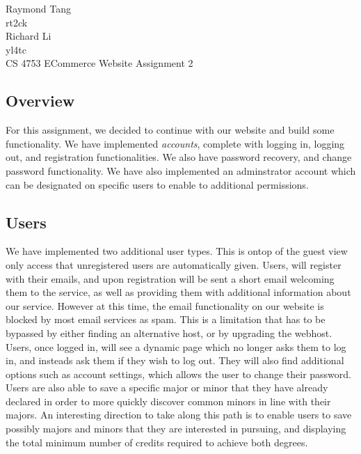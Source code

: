 \documentclass{article}
\begin{document}
\begin{singlespace}
\noindent Raymond Tang\\
rt2ck\\
Richard Li\\
yl4tc\\
CS 4753 ECommerce Website Assignment 2\\
\end{singlespace}

\begin{doublespace}
\subsection*{Overview}
\indent For this assignment, we decided to continue with our website and build some functionality. We have implemented \emph{accounts}, complete with logging in, logging out, and registration functionalities. We also have password recovery, and change password functionality. We have also implemented an adminstrator account which can be designated on specific users to enable to additional permissions.\\

\subsection*{Users}
\indent We have implemented two additional user types. This is ontop of the guest view only access that unregistered users are automatically given. Users, will register with their emails, and upon registration will be sent a short email welcoming them to the service, as well as providing them with additional information about our service. However at this time, the email functionality on our website is blocked by most email services as spam. This is a limitation that has to be bypassed by either finding an alternative host, or by upgrading the webhost.\\
\indent Users, once logged in, will see a dynamic page which no longer asks them to log in, and insteads ask them if they wish to log out. They will also find additional options such as account settings, which allows the user to change their password.\\
\indent Users are also able to save a specific major or minor that they have already declared in order to more quickly discover common minors in line with their majors. An interesting direction to take along this path is to enable users to save possibly majors and minors that they are interested in pursuing, and displaying the total minimum number of credits required to achieve both degrees.\\


\end{doublespace}
\end{document}
